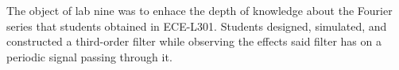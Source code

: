 The object of lab nine was to enhace the depth of knowledge about the Fourier
series that students obtained in ECE-L301.  Students designed, simulated, and
constructed a third-order filter while observing the effects said filter has on
a periodic signal passing through it.
